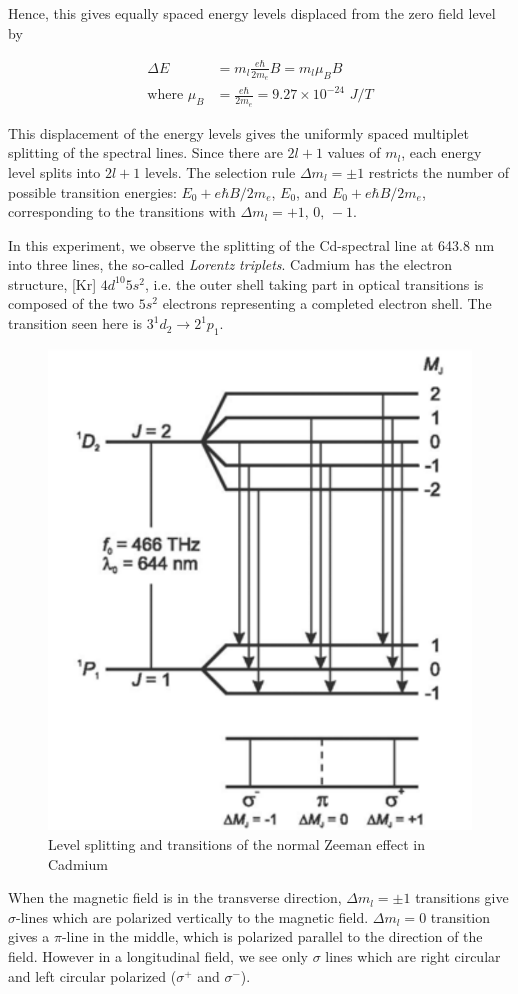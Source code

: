 Hence, this gives equally spaced energy levels displaced from the zero field level by

\begin{align} \label{deltaE}
    \Delta E &= m_l\frac{e\hbar}{2m_e}B = m_l \mu_B B\\
    \text{where } \mu_B &= \frac{e\hbar}{2m_e} = 9.27 \times 10^{-24}\,\,J/T \nonumber
\end{align}

This displacement of the energy levels gives the uniformly spaced multiplet splitting of the spectral lines. 
Since there are $2l + 1$ values of $m_l$, each energy level
splits into $2l + 1$ levels. The selection rule
$\Delta m_l = \pm 1$ restricts the number of possible transition energies: $E_0 + e\hbar B/2m_e$, $E_0$,
and $E_0 + e\hbar B/2m_e$, corresponding to the transitions with $\Delta m_l = +1,\,0,\,-1$.

In this experiment, we observe the splitting of the Cd-spectral line at 643.8 nm into three lines, the so-called \textit{Lorentz triplets}. Cadmium has the electron structure, [Kr] $4d^{10}5s^2$, i.e.
the outer shell taking part in optical transitions is composed of the two $5s^2$
electrons representing a completed
electron shell. The transition seen here is $3^1d_2 \rightarrow 2^1p_1$.

\begin{figure}
    \centering
    \includegraphics[width=.45\columnwidth]{images/th1.png}
    \caption{Level splitting and transitions of the normal Zeeman effect in Cadmium}
\end{figure}

When the magnetic field is in the transverse direction, $\Delta m_l = \pm 1$  transitions give $\sigma$-lines which are polarized vertically to the magnetic field. $\Delta m_l = 0$ transition gives a $\pi$-line in the middle, which is polarized parallel to the direction of the field.
However in a longitudinal field, we see only $\sigma$ lines which are right circular and left circular polarized ($\sigma^+$ and $\sigma^-$). 

